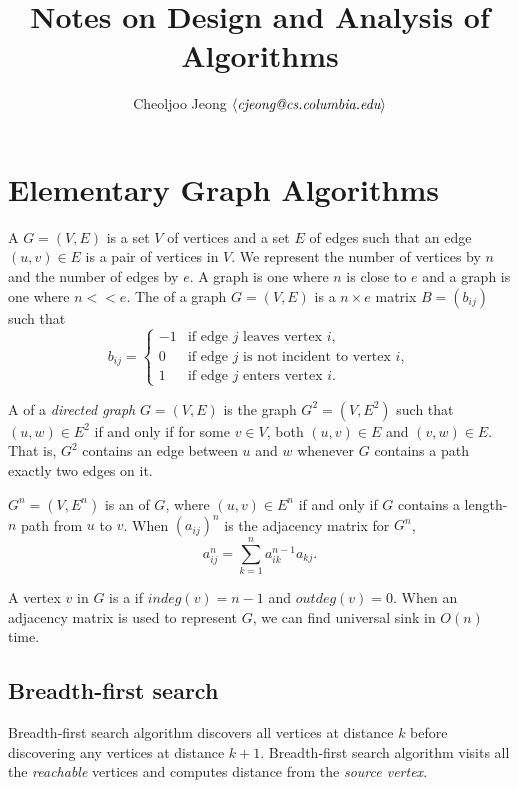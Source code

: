 \documentclass{myproc}
\begin{document}
\title{\large\bf Notes on Design and Analysis of Algorithms \vspace*{-0.5cm}}
\author{\normalsize{}Cheoljoo Jeong $\mbox{$\langle{\textit{\mbox{cjeong@cs.columbia.edu}}}\rangle$}$}
\maketitle
\small

\section{Elementary Graph Algorithms}
\bit
\w A  
   $G = (V, E)$ is a set $V$ of vertices and a set $E$ of edges such
   that an edge $(u, v) \in E$ is a pair of vertices in $V$.
   We represent the number of vertices by $n$ and the number of edges by $e$.
\w A  graph is one where $n$ is close to $e$ and a  
   graph is one where $n <\!\!\!< e$.
\w The  of a graph $G = (V, E)$ is a $n \times e$ matrix
   $B = (b_{ij})$ such that
   \[ b_{ij} = \left\{\begin{array}{ll}
        -1 & \mbox{if edge $j$ leaves vertex $i$},\\
        0 & \mbox{if edge $j$ is not incident to vertex $i$},\\
        1 & \mbox{if edge $j$ enters vertex $i$}.
		   \end{array}\right. 
\]

\w {} 
   A  of a {\em directed graph\/} $G = (V, E)$ is the graph $G^2 =
   (V, E^2)$ such that $(u, w) \in E^2$ if and only if for some $v \in V$, 
   both $(u, v) \in E$ and $(v, w) \in E$.  That is, $G^2$ contains an edge
   between $u$ and $w$ whenever $G$ contains a path exactly two edges on it.

\w {} $G^n = (V, E^n)$ is an  of $G$, where $(u, v) \in E^n$ if and only if $G$ contains
   a length-$n$ path from $u$ to $v$. 
   When $(a_{ij})^n$ is the adjacency matrix for $G^n$,
   \[ a_{ij}^n = \sum_{k = 1}^na_{ik}^{n-1}a_{kj}. \]

\w {} A vertex $v$ in $G$ is a  if
   $indeg(v) = n - 1$ and 
   $outdeg(v) = 0$. When an adjacency matrix is used to represent $G$, we can
   find universal sink in $O(n)$ time.
   
\eit

\subsection{Breadth-first search}
\bit
\w Breadth-first search algorithm discovers all vertices at distance $k$
   before discovering any vertices at distance $k+1$. 
\w Breadth-first search algorithm visits all the {\em reachable\/} vertices
   and computes  distance from the {\em source vertex\/}.
\eit



\nocite{CLRS01}
\end{document}
